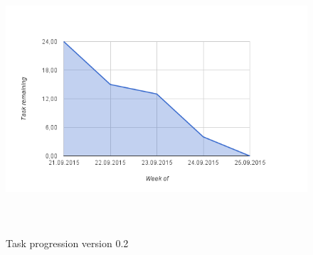 \begin{figure}
\centering
\includegraphics[height=10cm]{figs/v02/version-progress.png}
\caption{Task progression version 0.2}
\label{fig:version-progress-2}
\end{figure}

